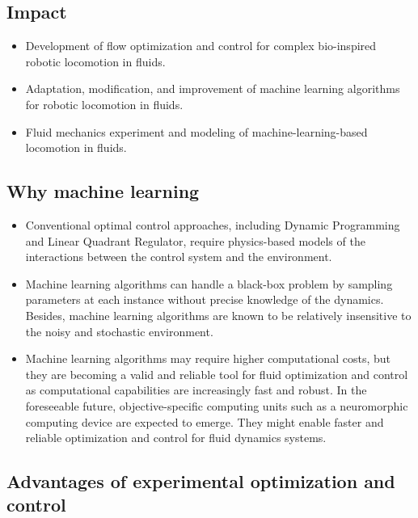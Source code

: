 \documentclass[12pt, a4paper]{article}
\providecommand{\tightlist}{%
  \setlength{\itemsep}{0pt}\setlength{\parskip}{0pt}}
\begin{document}
\hypertarget{impact-1}{%
\subsection{Impact}\label{impact-1}}

\begin{itemize}
\tightlist
\item
  Development of flow optimization and control for complex bio-inspired
  robotic locomotion in fluids.
\item
  Adaptation, modification, and improvement of machine learning
  algorithms for robotic locomotion in fluids.
\item
  Fluid mechanics experiment and modeling of machine-learning-based
  locomotion in fluids.
\end{itemize}

\hypertarget{why-machine-learning-1}{%
\subsection{Why machine learning}\label{why-machine-learning-1}}

\begin{itemize}
\tightlist
\item
  Conventional optimal control approaches, including Dynamic Programming
  and Linear Quadrant Regulator, require physics-based models of the
  interactions between the control system and the environment.
\item
  Machine learning algorithms can handle a black-box problem by sampling
  parameters at each instance without precise knowledge of the dynamics.
  Besides, machine learning algorithms are known to be relatively
  insensitive to the noisy and stochastic environment.
\item
  Machine learning algorithms may require higher computational costs,
  but they are becoming a valid and reliable tool for fluid optimization
  and control as computational capabilities are increasingly fast and
  robust. In the foreseeable future, objective-specific computing units
  such as a neuromorphic computing device are expected to emerge. They
  might enable faster and reliable optimization and control for fluid
  dynamics systems.
\end{itemize}

\hypertarget{advantages-of-experimental-optimization-and-control-1}{%
\subsection{Advantages of experimental optimization and
control}\label{advantages-of-experimental-optimization-and-control-1}}
\end{document}
